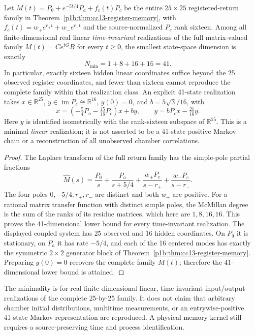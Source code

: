 \documentclass[11pt]{article}
\begin{document}
\begin{theorem}
\label{p1b:thm:cc16-minimal-41state-memory}
Let $M(t)=P_0+e^{-5t/4}P_a+f_c(t)P_c$ be the entire
$25\times25$ registered-return family in
Theorem~\ref{p1b:thm:cc13-register-memory}, with
$f_c(t)=w_+e^{r_+t}+w_-e^{r_-t}$ and the source-normalized
$P_c$ rank sixteen. Among all finite-dimensional real linear
\emph{time-invariant} realizations of the full matrix-valued family
$M(t)=C e^{tG}B$ for every $t\ge0$, the smallest state-space
dimension is exactly
\[
 \boxed{N_{\min}=1+8+16+16=41.}
\]
In particular, exactly sixteen hidden linear coordinates suffice
beyond the 25 observed register coordinates, and fewer than sixteen
cannot reproduce the complete family within that realization class.
An explicit 41-state realization takes $x\in\mathbb R^{25}$,
$y\in\operatorname{im}P_c\cong\mathbb R^{16}$,
$y(0)=0$, and $b=5\sqrt3/16$, with
\[
 \boxed{\dot x=(-\tfrac54P_a-\tfrac{15}{16}P_c)x+b y,\qquad
        \dot y=bP_cx-\tfrac{21}{16}y.}
\]
Here $y$ is identified isometrically with the rank-sixteen subspace
of $\mathbb R^{25}$. This is a minimal \emph{linear} realization;
it is not asserted to be a 41-state positive Markov chain or a
reconstruction of all unobserved chamber correlations.
\end{theorem}
\begin{proof}
The Laplace transform of the full return family has the simple-pole
partial fractions
\[
 \widehat M(s)=\frac{P_0}{s}+\frac{P_a}{s+5/4}
     +\frac{w_+P_c}{s-r_+}+\frac{w_-P_c}{s-r_-}.
\]
The four poles $0,-5/4,r_+,r_-$ are distinct and both $w_\pm$
are positive. For a rational matrix transfer function with distinct
simple poles, the McMillan degree is the sum of the ranks of its
residue matrices, which here are $1,8,16,16$. This proves the
41-dimensional lower bound for every time-invariant realization.
The displayed coupled system has 25 observed and 16 hidden
coordinates. On $P_0$ it is stationary, on $P_a$ it has rate $-5/4$,
and each of the 16 centered modes has exactly the symmetric $2\times2$
generator block of Theorem~\ref{p1b:thm:cc13-register-memory}.
Preparing $y(0)=0$ recovers the complete family $M(t)$; therefore
the 41-dimensional lower bound is attained.
\end{proof}
\begin{remark}
The minimality is for real finite-dimensional linear, time-invariant
input/output realizations of the complete 25-by-25 family. It does
not claim that arbitrary chamber initial distributions, multitime
measurements, or an entrywise-positive 41-state Markov representation
are reproduced. A physical memory kernel still requires a
source-preserving time and process identification.
\end{remark}
\end{document}

